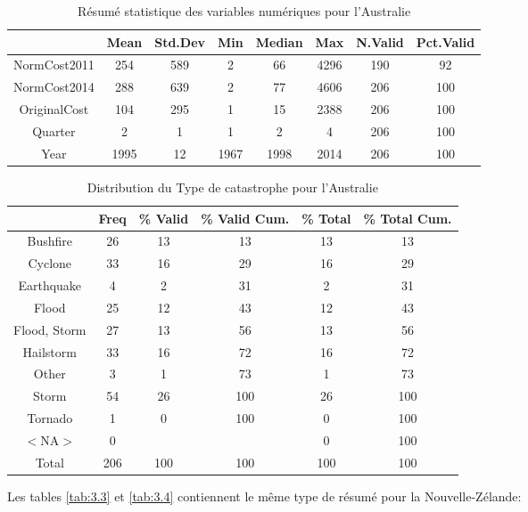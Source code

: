 \documentclass[11pt]{report}
\numberwithin{equation}{section}
\begin{document}
\begin{table}[ht]
\centering
\begin{tabular}{cccccccc}
  \hline
 & Mean & Std.Dev & Min & Median & Max & N.Valid & Pct.Valid \\ 
  \hline
NormCost2011 & 254 & 589 & 2 & 66 & 4296 & 190 & 92 \\ 
  NormCost2014 & 288 & 639 & 2 & 77 & 4606 & 206 & 100 \\ 
  OriginalCost & 104 & 295 & 1 & 15 & 2388 & 206 & 100 \\ 
  Quarter & 2 & 1 & 1 & 2 & 4 & 206 & 100 \\ 
  Year & 1995 & 12 & 1967 & 1998 & 2014 & 206 & 100 \\ 
   \hline
\end{tabular}
\caption{Résumé statistique des variables numériques pour l'Australie} 
\label{tab:3.1}
\end{table}%
\begin{table}[ht]
\centering
\begin{tabular}{cccccc}
  \hline
 & Freq & \% Valid & \% Valid Cum. & \% Total & \% Total Cum. \\ 
  \hline
Bushfire & 26 & 13 & 13 & 13 & 13 \\ 
  Cyclone & 33 & 16 & 29 & 16 & 29 \\ 
  Earthquake & 4 & 2 & 31 & 2 & 31 \\ 
  Flood & 25 & 12 & 43 & 12 & 43 \\ 
  Flood, Storm & 27 & 13 & 56 & 13 & 56 \\ 
  Hailstorm & 33 & 16 & 72 & 16 & 72 \\ 
  Other & 3 & 1 & 73 & 1 & 73 \\ 
  Storm & 54 & 26 & 100 & 26 & 100 \\ 
  Tornado & 1 & 0 & 100 & 0 & 100 \\ 
  $<$NA$>$ & 0 &  &  & 0 & 100 \\ 
  Total & 206 & 100 & 100 & 100 & 100 \\ 
   \hline
\end{tabular}
\caption{Distribution du Type de catastrophe pour l'Australie} 
\label{tab:3.2}
\end{table}
Les tables \ref{tab:3.3} et \ref{tab:3.4} contiennent le même type de résumé pour la Nouvelle-Zélande:
\end{document}
